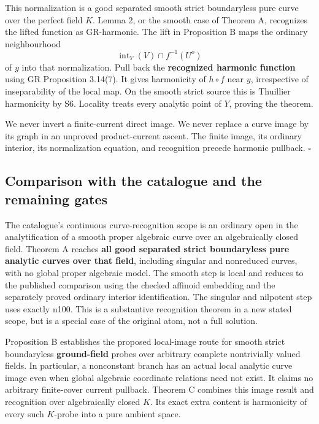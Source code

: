 \documentclass[
  11pt,
]{article}
\begin{document}
This normalization is a good separated smooth strict boundaryless pure
curve over the perfect field \(K\). Lemma 2, or the smooth case of
Theorem A, recognizes the lifted function as GR-harmonic. The lift in
Proposition B maps the ordinary neighbourhood \[
         \operatorname{int}_Y(V)\cap f^{-1}(U^o)
\] of \(y\) into that normalization. Pull back the \textbf{recognized
harmonic function} using GR Proposition 3.14(7). It gives harmonicity of
\(h\circ f\) near \(y\), irrespective of inseparability of the local
map. On the smooth strict source this is Thuillier harmonicity by S6.
Locality treats every analytic point of \(Y\), proving the theorem.

We never invert a finite-current direct image. We never replace a curve
image by its graph in an unproved product-current ascent. The finite
image, its ordinary interior, its normalization equation, and
recognition precede harmonic pullback. \(\square\)

\subsection{Comparison with the catalogue and the remaining
gates}\label{comparison-with-the-catalogue-and-the-remaining-gates}

The catalogue's continuous curve-recognition scope is an ordinary open
in the analytification of a smooth proper algebraic curve over an
algebraically closed field. Theorem A reaches \textbf{all good separated
strict boundaryless pure analytic curves over that field}, including
singular and nonreduced curves, with no global proper algebraic model.
The smooth step is local and reduces to the published comparison using
the checked affinoid embedding and the separately proved ordinary
interior identification. The singular and nilpotent step uses exactly
n100. This is a substantive recognition theorem in a new stated scope,
but is a special case of the original atom, not a full solution.

Proposition B establishes the proposed local-image route for smooth
strict boundaryless \textbf{ground-field} probes over arbitrary complete
nontrivially valued fields. In particular, a nonconstant branch has an
actual local analytic curve image even when global algebraic coordinate
relations need not exist. It claims no arbitrary finite-cover current
pullback. Theorem C combines this image result and recognition over
algebraically closed \(K\). Its exact extra content is harmonicity of
every such \(K\)-probe into a pure ambient space.
\end{document}
